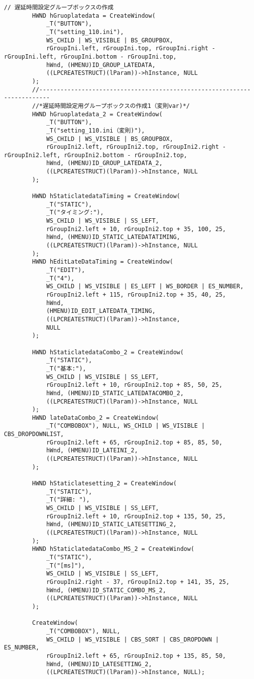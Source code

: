\begin{lstlisting}[caption=window.cpp]
		// 遅延時間設定グループボックスの作成
		HWND hGruoplatedata = CreateWindow(
			_T("BUTTON"),
			_T("setting_110.ini"),
			WS_CHILD | WS_VISIBLE | BS_GROUPBOX,
			rGroupIni.left, rGroupIni.top, rGroupIni.right - rGroupIni.left, rGroupIni.bottom - rGroupIni.top,
			hWnd, (HMENU)ID_GROUP_LATEDATA,
			((LPCREATESTRUCT)(lParam))->hInstance, NULL
		);
		//-------------------------------------------------------------------------
		//*遅延時間設定用グループボックスの作成1（変則var)*/
		HWND hGruoplatedata_2 = CreateWindow(
			_T("BUTTON"),
			_T("setting_110.ini（変則)"),
			WS_CHILD | WS_VISIBLE | BS_GROUPBOX,
			rGroupIni2.left, rGroupIni2.top, rGroupIni2.right - rGroupIni2.left, rGroupIni2.bottom - rGroupIni2.top,
			hWnd, (HMENU)ID_GROUP_LATEDATA_2,
			((LPCREATESTRUCT)(lParam))->hInstance, NULL
		);

		HWND hStaticlatedataTiming = CreateWindow(
			_T("STATIC"),
			_T("タイミング:"),
			WS_CHILD | WS_VISIBLE | SS_LEFT,
			rGroupIni2.left + 10, rGroupIni2.top + 35, 100, 25,
			hWnd, (HMENU)ID_STATIC_LATEDATATIMING,
			((LPCREATESTRUCT)(lParam))->hInstance, NULL
		);
		HWND hEditLateDataTiming = CreateWindow(
			_T("EDIT"),
			_T("4"),
			WS_CHILD | WS_VISIBLE | ES_LEFT | WS_BORDER | ES_NUMBER,
			rGroupIni2.left + 115, rGroupIni2.top + 35, 40, 25,
			hWnd,
			(HMENU)ID_EDIT_LATEDATA_TIMING,
			((LPCREATESTRUCT)(lParam))->hInstance,
			NULL
		);

		HWND hStaticlatedataCombo_2 = CreateWindow(
			_T("STATIC"),
			_T("基本:"),
			WS_CHILD | WS_VISIBLE | SS_LEFT,
			rGroupIni2.left + 10, rGroupIni2.top + 85, 50, 25,
			hWnd, (HMENU)ID_STATIC_LATEDATACOMBO_2,
			((LPCREATESTRUCT)(lParam))->hInstance, NULL
		);
		HWND lateDataCombo_2 = CreateWindow(
			_T("COMBOBOX"), NULL, WS_CHILD | WS_VISIBLE | CBS_DROPDOWNLIST,
			rGroupIni2.left + 65, rGroupIni2.top + 85, 85, 50,
			hWnd, (HMENU)ID_LATEINI_2,
			((LPCREATESTRUCT)(lParam))->hInstance, NULL
		);

		HWND hStaticlatesetting_2 = CreateWindow(
			_T("STATIC"),
			_T("詳細: "),
			WS_CHILD | WS_VISIBLE | SS_LEFT,
			rGroupIni2.left + 10, rGroupIni2.top + 135, 50, 25,
			hWnd, (HMENU)ID_STATIC_LATESETTING_2,
			((LPCREATESTRUCT)(lParam))->hInstance, NULL
		);
		HWND hStaticlatedataCombo_MS_2 = CreateWindow(
			_T("STATIC"),
			_T("[ms]"),
			WS_CHILD | WS_VISIBLE | SS_LEFT,
			rGroupIni2.right - 37, rGroupIni2.top + 141, 35, 25,
			hWnd, (HMENU)ID_STATIC_COMBO_MS_2,
			((LPCREATESTRUCT)(lParam))->hInstance, NULL
		);

		CreateWindow(
			_T("COMBOBOX"), NULL,
			WS_CHILD | WS_VISIBLE | CBS_SORT | CBS_DROPDOWN | ES_NUMBER,
			rGroupIni2.left + 65, rGroupIni2.top + 135, 85, 50,
			hWnd, (HMENU)ID_LATESETTING_2,
			((LPCREATESTRUCT)(lParam))->hInstance, NULL);


\end{lstlisting}
